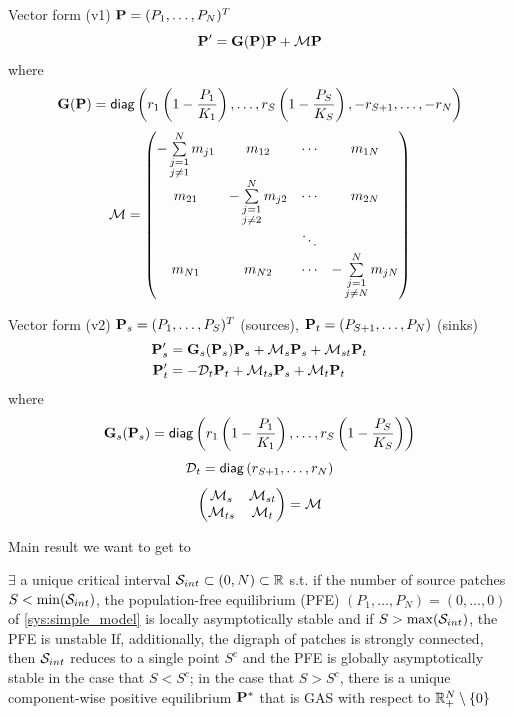 \documentclass[aspectratio=169]{beamer}
\begin{document}
\begin{frame}{Vector form (v1)}
	$\bP=(P_1,\ldots,P_N)^T$
	\vfill
	\[
	\bP' = \bG(\bP)\bP+\M\bP
	\]
	where
	\[
	\bG(\bP) =
	\diag\left(
	r_1\left(1-\frac{P_1}{K_1}\right),\ldots,r_S\left(1-\frac{P_S}{K_S}\right),
	-r_{S+1},\ldots,-r_N
	\right)
	\]
	\[
	\M =
	\begin{pmatrix}
	-\sum\limits_{\substack{j=1\\j\neq 1}}^N m_{j1} & m_{12} & \cdots & m_{1N} \\
	m_{21} & -\sum\limits_{\substack{j=1\\j\neq 2}}^N m_{j2} & \cdots & m_{2N} \\
	& & \ddots & \\
	m_{N1} & m_{N2} & \cdots & -\sum\limits_{\substack{j=1\\j\neq N}}^N m_{jN}
	\end{pmatrix}
	\]
\end{frame}
	
\begin{frame}{Vector form (v2)}
	$\bP_s=(P_1,\ldots,P_S)^T$ (sources), \quad $\bP_t =(P_{S+1},\ldots,P_N)$ (sinks)
	\vfill
	\begin{align*}
	\bP_s' &= \bG_s(\bP_s)\bP_s+\M_s\bP_s+\M_{st}\bP_t \\
	\bP_t' &= -\D_t\bP_t+\M_{ts}\bP_s+\M_t\bP_t
	\end{align*}
	where
	\[
	\bG_s(\bP_s) =
	\diag\left(
	r_1\left(1-\frac{P_1}{K_1}\right),\ldots,r_S\left(1-\frac{P_S}{K_S}\right)
	\right)
	\]
	\[
	\D_t = \diag\left(r_{S+1},\ldots,r_N\right)
	\]
	\[
	\begin{pmatrix}
	\M_s & \M_{st} \\ \M_{ts} & \M_t
	\end{pmatrix} = \M
	\]
\end{frame}


\begin{frame}{Main result we want to get to}
	\begin{theorem}\label{th:main_result}
		$\exists$ a unique critical interval $\S_{int}\subset(0,N)\subset\IR$ s.t. if the number of source patches $S<\min(\S_{int})$, the population-free equilibrium (PFE) $(P_1,\ldots,P_N)=(0,\ldots,0)$ of \eqref{sys:simple_model} is locally asymptotically stable and if $S>\max(\S_{int})$, the PFE is unstable
		\vskip0.5cm
		If, additionally, the digraph of patches is strongly connected, then $\S_{int}$ reduces to a single point $S^c$ and the PFE is globally asymptotically stable in the case that $S<S^c$; in the case that $S>S^c$, there is a unique component-wise positive equilibrium $\bP^*$ that is GAS with respect to $\IR_+^N\setminus\{0\}$
		\end{theorem}
		
\end{frame}
\end{document}
